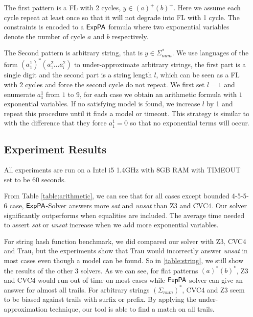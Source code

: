 The first pattern is a FL with 2 cycles, $y \in (a)^+(b)^+$. Here we assume each cycle repeat at least once so that it will not degrade into FL with 1 cycle. The constraints is encoded to a ${\sf ExpPA}$ formula where two exponential variables denote the number of cycle $a$ and $b$ respectively.

The Second pattern is arbitrary string, that is $y\in \Sigma_{num}^*$. We use languages of the form $(a^1_1)^* (a^2_1...a^2_l)$ to under-approximate arbitrary strings, the first part is a single digit and the second part is a string length $l$, which can be seen as a FL with 2 cycles and force the second cycle do not repeat. We first set $l=1$ and enumerate $a^1_1$ from $1$ to $9$, for each case we obtain an arithmetic formula with $1$ exponential variables. If no satisfying model is found, we increase $l$ by 1 and repeat this procedure until it finds a model or timeout. This strategy is similar to \cite{Abdulla2020} with the difference that they force $a^1_1=0$ so that no exponential terms will occur.

\subsection{Experiment Results}

All experiments are run on a Intel i5 1.4GHz with 8GB RAM with TIMEOUT set to be 60 seconds. 


From Table \ref{table:arithmetic}, we can see that for all cases except bounded 4-5-5-6 case, ${\sf ExpPA}$-Solver answers more \textit{sat} and \textit{unsat} than Z3 and CVC4. Our solver significantly outperforms when equalities are included. The average time needed to assert \textit{sat} or \textit{unsat} increase when we add more exponential variables.


For string hash function benchmark, we did compared our solver with Z3, CVC4 and Trau, but the experiments show that Trau would incorrectly answer \textit{unsat} in most cases even though a model can be found. So in \ref{table:string}, we still show the results of the other 3 solvers. As we can see, for flat patterns $(a)^*(b)^*$, Z3 and CVC4 would run out of time on most cases while ${\sf ExpPA}$-solver can give an answer for almost all trails. For arbitrary strings $(\Sigma_{num})^*$, CVC4 and Z3 seem to be biased against trails with surfix or prefix. By applying the under-approximation technique, our tool is able to find a match on all trails. 


